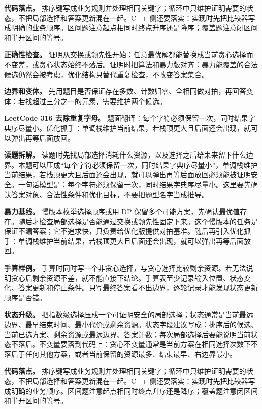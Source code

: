 \textbf{代码落点。} 排序键写成业务规则并处理相同关键字；循环中只维护证明需要的状态，不把局部选择和答案更新混在一起。C++ 侧还要落实：实现时先把比较器写成明确的业务顺序。区间题注意起点相同时终点升序还是降序；覆盖题注意闭区间和半开区间的等号。

\textbf{正确性检查。} 证明从交换或领先性开始：任意最优解都能替换成当前贪心选择而不变差，或贪心状态始终不落后。证明时把算法和暴力版对齐：暴力能覆盖的合法候选仍然会被考虑，优化结构只替代重复检查，不改变答案集合。

\textbf{边界和变体。} 先用题目是否保证存在多数、计数归零、全相同做对拍，再回答变体：若找超过三分之一的元素，需要维护两个候选。

\noindent\textbf{LeetCode 316 去除重复字母。} 题面翻译：每个字符必须保留一次，同时结果字典序尽量小。优化抓手：单调栈维护当前结果，若栈顶更大且后面还会出现，就可以弹出再等后面放回。

\textbf{读题拆解。} 读题时先找局部选择消耗什么资源，以及选择之后给未来留下什么边界。本题可以压成“每个字符必须保留一次，同时结果字典序尽量小”，单调栈维护当前结果，若栈顶更大且后面还会出现，就可以弹出再等后面放回必须能被证明安全。一句话模型是：每个字符必须保留一次，同时结果字典序尽量小。这里要先确认答案对象、合法性条件和优化目标，不要把题型名字当成推导。

\textbf{暴力基线。} 慢版本枚举选择顺序或用 DP 保留多个可能方案，先确认最优值存在。随后才检查局部选择是否能通过交换或领先性固定下来。这个慢版本的任务是保证不漏答案；它不追求快，只负责给优化版提供对拍基准。随后再引入优化抓手：单调栈维护当前结果，若栈顶更大且后面还会出现，就可以弹出再等后面放回。

\textbf{手算样例。} 手算时同时写一个非贪心选择，与贪心选择比较剩余资源。若无法说明贪心后剩余资源不差，就不能直接下结论。手算表至少记录输入位置、状态变化、答案更新和停止条件。只写最终答案看不出边界，逐轮记录才能发现状态更新顺序是否错。

\textbf{状态升级。} 把指数级选择压成一个可证明安全的局部选择；状态通常是当前最远边界、最早结束时间、最小代价或剩余资源。状态字段建议写成：排序后的候选、当前已选方案、剩余资源或最远边界、答案计数；每次局部选择后要能说明当前状态不落后。不变量要落到代码上：贪心不变量通常是当前方案在相同选择次数下不落后于任何其他方案，或者当前保留的资源最多、结束最早、右边界最小。

\textbf{代码落点。} 排序键写成业务规则并处理相同关键字；循环中只维护证明需要的状态，不把局部选择和答案更新混在一起。C++ 侧还要落实：实现时先把比较器写成明确的业务顺序。区间题注意起点相同时终点升序还是降序；覆盖题注意闭区间和半开区间的等号。

